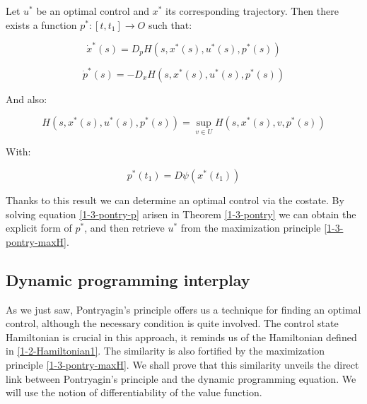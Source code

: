 \begin{theorem}\label{1-3-pontry}
    Let $u^{\ast}$ be an optimal control and $x^{\ast}$ its corresponding trajectory. 
    Then there exists a function $p^{\ast}:[t,t_1]\rightarrow O$ such that:

    \begin{equation}\label{1-3-pontry-x}
        \dot{x}^{\ast}(s) = D_p H(s,x^{\ast}(s),u^{\ast}(s),p^{\ast}(s)) 
    \end{equation}

    \begin{equation}\label{1-3-pontry-p}
        \dot{p}^{\ast}(s) =  - D_x H(s,x^{\ast}(s),u^{\ast}(s),p^{\ast}(s)) 
    \end{equation}

    And also:

    \begin{equation}\label{1-3-pontry-maxH}
        H(s,x^{\ast}(s),u^{\ast}(s),p^{\ast}(s)) = \sup_{v\in U} H(s,x^{\ast}(s),v,p^{\ast}(s))
    \end{equation}

    With:

    \begin{equation}\label{1-3-pontry-tras}
        p^{\ast}(t_1) = D \psi(x^{\ast}(t_1))
    \end{equation}
\end{theorem}

Thanks to this result we can determine an optimal control via the costate. By solving equation \eqref{1-3-pontry-p} 
arisen in Theorem \ref{1-3-pontry} we can obtain the explicit form of $p^{\ast}$, and then 
retrieve $u^{\ast}$ from the maximization principle \eqref{1-3-pontry-maxH}.


\subsection{Dynamic programming interplay}

As we just saw, Pontryagin's principle offers us a technique 
for finding an optimal control, although the necessary condition is quite involved. The control state Hamiltonian is crucial in this approach, it reminds 
us of the Hamiltonian defined in \eqref{1-2-Hamiltonian1}. The similarity is also fortified by the maximization 
principle \eqref{1-3-pontry-maxH}. We shall prove that this similarity unveils the direct link between 
Pontryagin's principle and the dynamic programming equation. We will use the notion of differentiability of the value function. 

